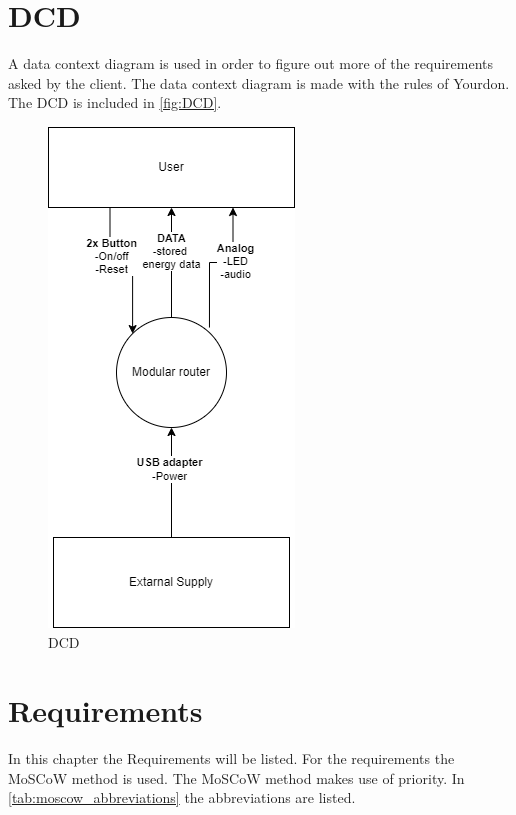 \section{DCD}
A data context diagram is used in order to figure out more of the requirements asked by the client. The data context diagram is made with the rules of Yourdon. The DCD is included in \autoref{fig:DCD}.

\begin{figure}[H]
    \centering
    \includegraphics{Images/Definition phase/DCD.drawio.png}
    \caption{DCD}
    \label{fig:DCD}
\end{figure}

\newpage
\section{Requirements}
In this chapter the Requirements will be listed. For the requirements the MoSCoW method is used. The MoSCoW method makes use of priority. In \autoref{tab:moscow_abbreviations} the abbreviations are listed.

